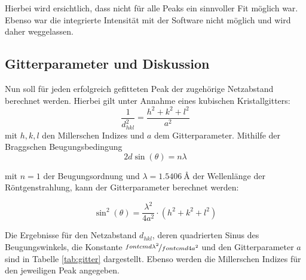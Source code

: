 Hierbei wird ersichtlich, dass nicht für alle Peaks ein sinnvoller Fit möglich war. Ebenso war die integrierte Intensität mit der Software nicht möglich und wird daher weggelassen. 

\subsection{Gitterparameter und Diskussion}

Nun soll für jeden erfolgreich gefitteten Peak der zugehörige Netzabstand berechnet werden. Hierbei gilt unter Annahme eines kubischen Kristallgitters:
\begin{equation}\label{eq:netzabstand}
    \frac{1}{d^2_{hkl}} = \frac{h^2 + k^2 + l^2}{a^2}
\end{equation}
mit $h, k, l$ den Millerschen Indizes und $a$ dem Gitterparameter. Mithilfe der Braggschen Beugungsbedingung
\begin{equation}
    2d\sin(\theta) = n\lambda
\end{equation}

mit $n = 1$ der Beugungsordnung und $\lambda = \SI[options]{1,5406}{\angstrom}$ der Wellenlänge der Röntgenstrahlung, kann der Gitterparameter berechnet werden:

\begin{equation}
    \sin^2(\theta) = \frac{\lambda^2}{4a^2} \cdot (h^2 + k^2 + l^2)
\end{equation}

Die Ergebnisse für den Netzabstand $d_{hkl}$, deren quadrierten Sinus des Beugungswinkels, die Konstante $\nicefrac[fontcmd]{\lambda^2}{4a^2}$ und den Gitterparameter $a$ sind in Tabelle \ref{tab:gitter} dargestellt. Ebenso werden die Millerschen Indizes für den jeweiligen Peak angegeben.

